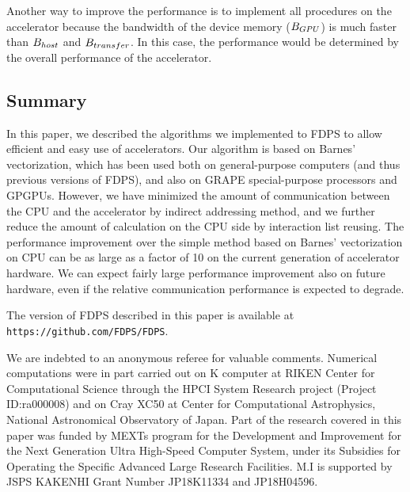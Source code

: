 \documentclass[dvipdfmx]{pasj01}
\begin{document}
Another way to improve the performance is to implement all procedures
on the accelerator because the bandwidth of the device memory ($B_{\rm
  GPU}$) is much faster than $B_{\rm host}$ and $B_{\rm transfer}$. In
this case, the performance would be determined by the overall
performance of the accelerator.

\subsection{Summary}

In this paper, we described the algorithms we implemented to FDPS to
allow efficient and easy use of accelerators. Our algorithm is based
on Barnes' vectorization, which has been used both on general-purpose
computers (and thus previous versions of FDPS), and also on GRAPE
special-purpose processors and GPGPUs. However, we have minimized the
amount of communication between the CPU and the accelerator by
indirect addressing method, and we further reduce the amount of
calculation on the CPU side by interaction list reusing. The
performance improvement over the simple method based on Barnes'
vectorization on CPU can be as large as a factor of 10 on the current
generation of accelerator hardware. We can expect fairly large
performance improvement also on future hardware, even if the relative
communication performance is expected to degrade.



The version of FDPS described in this paper is available at {\tt
  https://github.com/FDPS/FDPS}.

\bigskip

We are indebted to an anonymous referee for valuable comments.
Numerical computations were in part carried out on K computer at RIKEN
Center for Computational Science through the HPCI System Research
project (Project ID:ra000008) and on Cray XC50 at Center for
Computational Astrophysics, National Astronomical Observatory of
Japan. Part of the research covered in this paper was funded by MEXTs
program for the Development and Improvement for the Next Generation
Ultra High-Speed Computer System, under its Subsidies for Operating
the Specific Advanced Large Research Facilities. M.I is supported by
JSPS KAKENHI Grant Number JP18K11334 and JP18H04596.

\appendix
\renewcommand{\thesection}{\Alph{section}}
\renewcommand{\thesubsection}{\Alph{section}.\arabic{subsection}}
\setcounter{section}{0} 
\renewcommand{\theequation}{\Alph{section}.\arabic{equation} }
\setcounter{equation}{0}
\renewcommand{\thetable}{\Alph{section}.\arabic{table}}
\setcounter{table}{0}
\renewcommand{\thefigure}{\Alph{section}.\arabic{figure}}
\setcounter{figure}{0}
\end{document}
